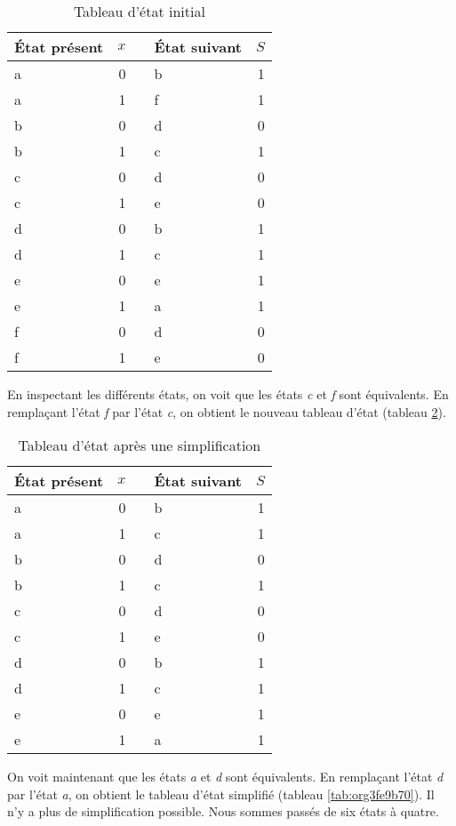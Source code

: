 \documentclass[letter, oneside]{book}
\begin{document}
\begin{table}[htbp]
\caption{\label{tab:orgfc80432}Tableau d'état initial}
\centering
\begin{tabular}{lrllr}
État présent & \(x\) &  & État suivant & \(S\)\\[0pt]
\hline
a & 0 &  & b & 1\\[0pt]
a & 1 &  & f & 1\\[0pt]
b & 0 &  & d & 0\\[0pt]
b & 1 &  & c & 1\\[0pt]
c & 0 &  & d & 0\\[0pt]
c & 1 &  & e & 0\\[0pt]
d & 0 &  & b & 1\\[0pt]
d & 1 &  & c & 1\\[0pt]
e & 0 &  & e & 1\\[0pt]
e & 1 &  & a & 1\\[0pt]
f & 0 &  & d & 0\\[0pt]
f & 1 &  & e & 0\\[0pt]
\end{tabular}
\end{table}

En inspectant les différents états, on voit que les états \emph{c} et \emph{f}
sont équivalents. En remplaçant l'état \emph{f} par l'état \emph{c}, on obtient
le nouveau tableau d'état (tableau \ref{tab:orgb5506f3}).

\begin{table}[htbp]
\caption{\label{tab:orgb5506f3}Tableau d'état après une simplification}
\centering
\begin{tabular}{lrllr}
État présent & \(x\) &  & État suivant & \(S\)\\[0pt]
\hline
a & 0 &  & b & 1\\[0pt]
a & 1 &  & c & 1\\[0pt]
b & 0 &  & d & 0\\[0pt]
b & 1 &  & c & 1\\[0pt]
c & 0 &  & d & 0\\[0pt]
c & 1 &  & e & 0\\[0pt]
d & 0 &  & b & 1\\[0pt]
d & 1 &  & c & 1\\[0pt]
e & 0 &  & e & 1\\[0pt]
e & 1 &  & a & 1\\[0pt]
\end{tabular}
\end{table}

On voit maintenant que les états \emph{a} et \emph{d} sont équivalents. En
remplaçant l'état \emph{d} par l'état \emph{a}, on obtient le tableau d'état
simplifié (tableau \ref{tab:org3fe9b70}). Il n'y a plus de simplification
possible. Nous sommes passés de six états à quatre.
\end{document}
